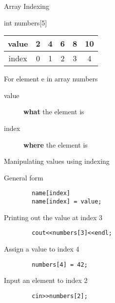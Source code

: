 \documentclass[xcolor={dvipsnames}]{beamer}
\begin{document}
\begin{frame}{Array Indexing}
	\begin{block}{int numbers[5]}
	\begin{table}
	\Huge
	\begin{tabular}{|c|c|c|c|c|c|}
	\hline
	value & 2  & 4 & 6 & 8 & 10\\
	\hline
	{\color{red} index} &  {\color{red} 0}   &  {\color{red} 1}  &   {\color{red} 2}  &  {\color{red} 3}  &  {\color{red} 4} \\
	\hline
	\end{tabular}
	\end{table}
	\end{block}
	\pause
	\begin{block}{For element e in array numbers}
		\begin{description}
			\item[value] \textbf{what} the element is
			\item[index] \textbf{where} the element is 
		\end{description}
	\end{block}
\end{frame}

\begin{frame}[fragile]{Manipulating values using indexing}
	\begin{block}{General form}
	\begin{verbatim}
		name[index]
		name[index] = value;
	\end{verbatim}
	\end{block}
	\pause
	\begin{block}{Printing out the value at index 3}
	\begin{verbatim}
		cout<<numbers[3]<<endl;
	\end{verbatim}
	\end{block}
	\pause
	\begin{block}{Assign a value to index 4}
	\begin{verbatim}
		numbers[4] = 42;
	\end{verbatim}
	\end{block}
\pause
	\begin{block}{Input an element to index 2}
	\begin{verbatim}
		cin>>numbers[2];
	\end{verbatim}
	\end{block}
\end{frame}
\end{document}
